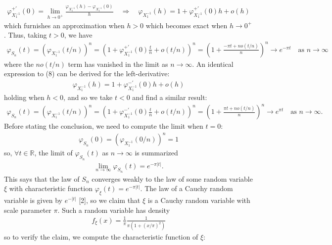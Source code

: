 \documentclass[10pt]{article}
\newcommand{\bp}[1]{\left({#1}\right)}
\newcommand{\mbb}[1]{\mathbb{#1}}
\newcommand{\1}[1]{\mathbbm{1}_{#1}}
\begin{document}
    \begin{align*}
        \varphi_{X_1^{-1}}^{+\prime}(0)=\lim_{h\rightarrow 0^+}\frac{\varphi_{X_1^{-1}}(h)-\varphi_{X_1^{-1}}(0)}{h}\quad\Rightarrow\quad\varphi_{X_1^{-1}}(h)=1+\varphi_{X_1^{-1}}^{+\prime}(0)h+o(h)\tag{8}
    \end{align*}
    which furnishes an approximation when $h>0$ which becomes exact when $h\rightarrow 0^+$. Thus, taking $t>0$, we have
    \begin{align*}
        \varphi_{S_n}(t)=(\varphi_{X_1^{-1}}(t/n))^n=\bp{1+\varphi_{X_1^{-1}}^{+\prime}(0)\frac{t}{n}+o(t/n)}^n=\bp{1+\frac{-\pi t+no(t/n)}{n}}^n\longrightarrow e^{-\pi t}\quad\text{as $n\rightarrow\infty$}\tag{9}
    \end{align*}
    where the $no(t/n)$ term has vanished in the limit as $n\rightarrow\infty$. An identical expression to (8) can be derived for the left-derivative:
    \begin{align*}
        \varphi_{X_1^{-1}}(h)=1+\varphi_{X_1^{-1}}^{-\prime}(0)h+o(h)
    \end{align*}
    holding when $h<0$, and so we take $t<0$ and find a similar result:
    \begin{align*}
        \varphi_{S_n}(t)=(\varphi_{X_1^{-1}}(t/n))^n=\bp{1+\varphi_{X_1^{-1}}^{-\prime}(0)\frac{t}{n}+o(t/n)}^n=\bp{1+\frac{\pi t+no(t/n)}{n}}^n\longrightarrow e^{\pi t}\quad\text{as $n\rightarrow\infty$}.\tag{10}
    \end{align*}
    Before stating the conclusion, we need to compute the limit when $t=0$:
    \begin{align*}
        \varphi_{S_n}(0)=(\varphi_{X_1^{-1}}(0/n))^n=1\tag{11}
    \end{align*}
    so, $\forall t\in\mbb{R}$, the limit of $\varphi_{S_n}(t)$ as $n\rightarrow\infty$ is summarized
    \begin{align*}
        \lim_{n\rightarrow\infty}\varphi_{S_n}(t)=e^{-\pi|t|}.
    \end{align*}
    This says that the law of $S_n$ converges weakly to the law of some random variable $\xi$ with characteristic function $\varphi_\xi(t)=e^{-\pi|t|}$. 
    The law of a Cauchy random variable is given by $e^{-|t|}$ [2], so we claim that $\xi$ is a Cauchy random variable with scale parameter $\pi$. Such a random variable has density
    \begin{align*}
        f_\xi(x)=\frac{1}{\pi}\frac{1}{\pi(1+(x/\pi)^2)}
    \end{align*} 
    so to verify the claim, we compute the characteristic function of $\xi$:
\end{document}
